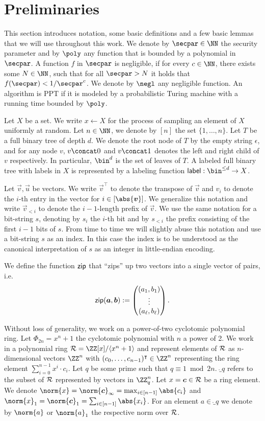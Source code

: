 \section{Preliminaries}\label{sec:prelim}
This section introduces notation, some basic definitions and a few basic lemmas that we will use throughout this work.
We denote by $\secpar\in\NN$ the security parameter and by $\poly$ any function that is bounded by a polynomial in $\secpar$.
A function $f$ in $\secpar$ is negligible, if for every $c \in \NN$, there exists some $N\in\NN$, such that for all $\secpar>N$ it holds that $f(\secpar) < 1/\secpar^c$.
We denote by $\negl$ any negligible function.
An algorithm is PPT if it is modeled by a probabilistic Turing machine with a running time bounded by $\poly$.

Let $X$ be a set.
We write $x\gets X$ for the process of sampling an element of $X$ uniformly at random.
Let $n\in\NN$, we denote by $[n]$ the set $\{1,\dots,n\}$.
Let $T$ be a full binary tree of depth $d$.
We denote the root node of $T$ by the empty string $\epsilon$, and for any node $v$, $v\concat 0$ and $v\concat 1$ denotes the left and right child of $v$ respectively.
In particular, $\bin^d$ is the set of leaves of $T$.
A labeled full binary tree with labels in $X$ is represented by a labeling function $\lbl : \bin^{\leq d} \to X$.

Let $\vec{v},\vec{u}$ be vectors.
We write $\vec{v}^\intercal$ to denote the transpose of $\vec{v}$ and $v_i$ to denote the $i$-th entry in the vector for $i\in[\abs{\vec{v}}]$.
We generalize this notation and write $\vec{v}_{< i}$ to denote the $i-1$-length prefix of $\vec{v}$.
We use the same notation for a bit-string $s$, denoting by $s_i$ the $i$-th bit and by $s_{<i}$ the prefix consisting of the first $i-1$ bits of $s$.
From time to time we will slightly abuse this notation and use a bit-string $s$ as an index.
In this case the index is to be understood as the canonical interpretation of $s$ as an integer in little-endian encoding.

We define the function $\mathsf{zip}$ that \enquote{zips} up two vectors into a single vector of pairs, i.e.
\[\mathsf{zip}(\boldsymbol{a},\boldsymbol{b}) := \begin{pmatrix}(a_1,b_1)\\
\vdots\\
(a_\ell,b_\ell) \end{pmatrix}.\]

Without loss of generality, we work on a power-of-two cyclotomic polynomial ring.
Let $\Phi_{2n} = x^n+1$ the cyclotomic polynomial with $n$ a power of 2. 
 We work in a polynomial ring $\ring =  \ZZ[x]/\langle x^n+1\rangle$ and represent elements of $\mathcal{R}$ as $n$-dimensional vectors $\ZZ^n$ with $(c_0,\dots,c_{n-1})^\intercal\in \ZZ^n$ representing the ring element $\sum_{i=0}^{n-1} x^i \cdot c_i$.
Let $q$  be some prime such that $q \equiv 1 \bmod 2n$.
$\ring_q$ refers to the subset of $\mathcal{R}$ represented by vectors in $\ZZ_q^n$.
Let $x = \boldsymbol{c} \in \mathcal{R}$ be a ring element. We denote $\norm{x} = \norm{\vec{c}}_\infty = \max_{i\in[n-1]}\abs{c_i}$ and $\norm{x}_1 = \norm{\vec{c}}_1 = \sum_{i\in[n-1]}\abs{x_i}$.
For an element $a\in\ring_q$ we denote by $\norm{a}$ or $\norm{a}_1$ the respective norm over $\mathcal{R}$.


